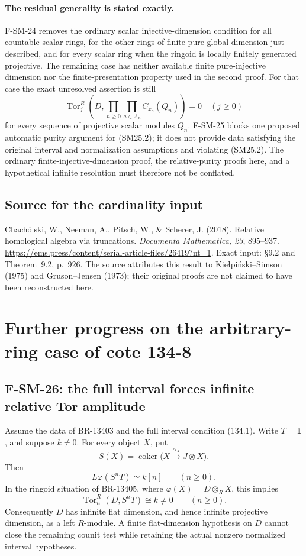 \documentclass[11pt,a4paper]{article}
\theoremstyle{definition}\newtheorem{definition}[theorem]{Definition}
\theoremstyle{remark}\newtheorem{remark}[theorem]{Remark}
\begin{document}
\paragraph{The residual generality is stated exactly.}
F-SM-24 removes the ordinary scalar injective-dimension condition
for all countable scalar rings, for the other rings of finite
pure global dimension just described, and for every scalar ring
when the ringoid is locally finitely generated projective.
The remaining case has neither available finite pure-injective
dimension nor the finite-presentation property used in the second
proof. For that case the exact unresolved assertion is still
\[
 \operatorname{Tor}_j^R
 \left(D,\prod_{n\geq0}\prod_{a\in A_n}C_{x_a}(Q_n)\right)=0
 \quad(j\geq0)
 \tag{SM25.2}
\]
for every sequence of projective scalar modules $Q_n$.
F-SM-25 blocks one proposed automatic purity argument for
(SM25.2); it does not provide data satisfying the original
interval and normalization assumptions and violating (SM25.2).
The ordinary finite-injective-dimension proof, the relative-purity
proofs here, and a hypothetical infinite resolution must therefore
not be conflated.

\subsection*{Source for the cardinality input}
Chach\'olski, W., Neeman, A., Pitsch, W., \& Scherer, J. (2018).
Relative homological algebra via truncations.
\emph{Documenta Mathematica, 23}, 895--937.
\url{https://ems.press/content/serial-article-files/26419?nt=1}.
Exact input: \S9.2 and Theorem~9.2, p.~926.
The source attributes this result to
Kie{\l}pi\'nski--Simson (1975) and Gruson--Jensen (1973);
their original proofs are not claimed to have been reconstructed here.



\section{Further progress on the arbitrary-ring case of cote 134-8}

\subsection{F-SM-26: the full interval forces infinite relative Tor amplitude}
Assume the data of BR-13403 and the full interval condition (134.1).
Write \(T=\mathbf1\), and suppose \(k\ne0\).  For every object \(X\), put
\[
 S(X)=\operatorname{coker}\bigl(X\xrightarrow{\alpha_X}J\otimes X\bigr).
\]
Then
\[
 L\varphi(S^nT)\simeq k[n]\qquad(n\ge0).
 \tag{SM26.1}
\]
In the ringoid situation of BR-13405, where
\(\varphi(X)=D\otimes_R X\), this implies
\[
 \operatorname{Tor}^{R}_n(D,S^nT)\cong k\ne0
 \qquad(n\ge0).
 \tag{SM26.2}
\]
Consequently \(D\) has infinite flat dimension, and hence infinite
projective dimension, as a left \(R\)-module.  A finite flat-dimension
hypothesis on \(D\) cannot close the remaining counit test while retaining
the actual nonzero normalized interval hypotheses.
\end{document}
